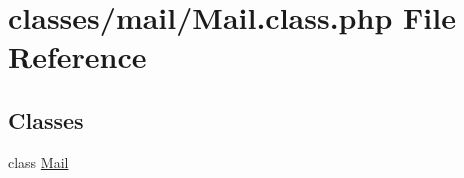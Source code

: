 \hypertarget{Mail_8class_8php}{}\section{classes/mail/\+Mail.class.\+php File Reference}
\label{Mail_8class_8php}
\subsection*{Classes}
\begin{DoxyCompactItemize}
\item 
class \hyperlink{classMail}{Mail}
\end{DoxyCompactItemize}
